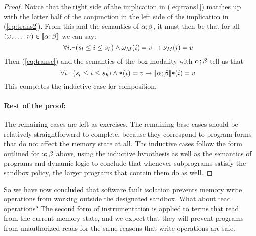 \documentclass[11pt,twoside]{scrartcl}
\begin{document}
\begin{proof}
Notice that the right side of the implication in (\ref{eq:trans1}) matches up with the latter half of the conjunction in the left side of the implication in (\ref{eq:trans2}).
From this and the semantics of $\alpha;\beta$, it must then be that for all $(\omega,\ldots,\nu)\in\llbracket\alpha;\beta\rrbracket$ we can say:
\begin{equation}
\label{eq:transc}
\forall i . \lnot(s_l \le i \le s_h)  \land \omega_M(i)=v \limply \nu_M(i)=v
\end{equation}
Then (\ref{eq:transc}) and the semantics of the box modality with $\alpha;\beta$ tell us that 
\begin{equation}
\forall i . \lnot(s_l \le i \le s_h)  \land \pderef{i}=v \limply \dbox{\asprg;\bsprg}{\pderef{i}=v}
\end{equation}
This completes the inductive case for composition. 

\paragraph{Rest of the proof:}
The remaining cases are left as exercises. The remaining base cases should be relatively straightforward to complete, because they correspond to program forms that do not affect the memory state at all. The inductive cases follow the form outlined for $\alpha;\beta$ above, using the inductive hypothesis as well as the semantics of programs and dynamic logic to conclude that whenever subprograms satisfy the sandbox policy, the larger programs that contain them do as well.
\end{proof}
So we have now concluded that software fault isolation prevents memory write operations from working outside the designated sandbox. What about read operations? The second form of instrumentation is applied to terms that read from the current memory state, and we expect that they will prevent programs from unauthorized reads for the same reasons that write operations are safe.
\end{document}
